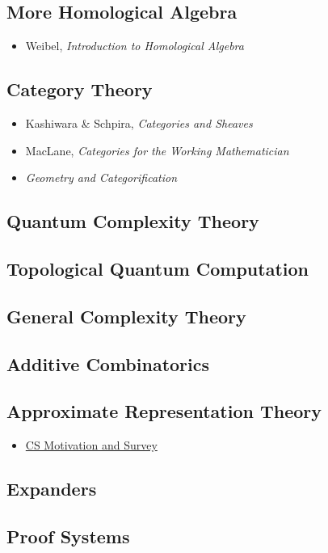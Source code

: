 \documentclass[12pt]{article}
\begin{document}
\subsection{More Homological Algebra}
\begin{itemize}
  \item Weibel, \textit{Introduction to Homological Algebra}
\end{itemize}

\subsection{Category Theory}
\begin{itemize}
  \item Kashiwara \& Schpira, \textit{Categories and Sheaves}
  \item MacLane, \textit{Categories for the Working Mathematician}
  \item \textit{Geometry and Categorification}
\end{itemize}

\subsection{Quantum Complexity Theory}

\subsection{Topological Quantum Computation}

\subsection{General Complexity Theory}

\subsection{Additive Combinatorics}

\subsection{Approximate Representation Theory}
\begin{itemize}
  \item \href{https://arxiv.org/pdf/1009.6230.pdf}{CS Motivation and Survey}
\end{itemize}

\subsection{Expanders}

\subsection{Proof Systems}
\end{document}
